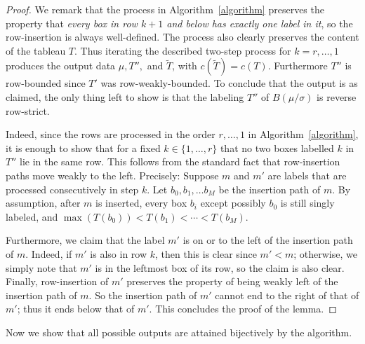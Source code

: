 \documentclass[ALCO,ThmDefs,Unicode,epreuves]{cedram}
\newcommand{\wt}{\widetilde}
\begin{document}
\begin{proof}
We remark that the process in Algorithm~\ref{algorithm} preserves the property that \emph{every box in row $k+1$ and below has exactly one label in it}, so the row-insertion is always well-defined. The process also clearly preserves the content of the tableau $T$. Thus iterating the described two-step process for $k=r,\ldots,1$ produces the output data $\mu, T'',$ and $\wt T$, with $c(\wt{T}) = c(T)$. Furthermore $T''$ is row-bounded since $T'$ was row-weakly-bounded. To conclude that the output is as claimed, the only thing left to show is that the labeling $T''$ of $B(\mu/\sigma)$ is reverse row-strict.

 Indeed, since the rows are processed in the order $r,\ldots,1$ in Algorithm~\ref{algorithm}, it is enough to show that for a fixed $k\in\{1,\ldots,r\}$ that no two boxes labelled $k$ in $T''$ lie in the same row. This follows from the standard fact that row-insertion paths move weakly to the left. Precisely: Suppose $m$ and $m'$ are labels that are processed consecutively in step $k$. Let $b_0,b_1,\ldots b_M$ be the insertion path of $m$. By assumption, after $m$ is inserted, every box $b_i$ except possibly $b_0$ is still singly labeled, and $\max(T(b_0)) < T(b_1) < \cdots < T(b_M)$. 

Furthermore, we claim that the label $m'$ is on or to the left of the insertion path of $m$. Indeed, if $m'$ is also in row $k$, then this is clear since $m'<m$; otherwise, we simply note that $m'$ is in the leftmost box of its row, so the claim is also clear. Finally, row-insertion of $m'$ preserves the property of being weakly left of the insertion path of $m$. So the insertion path of $m'$ cannot end to the right of that of $m'$; thus it ends below that of $m'$. This concludes the proof of the lemma.
\end{proof}

Now we show that all possible outputs are attained bijectively by the algorithm.
\end{document}
